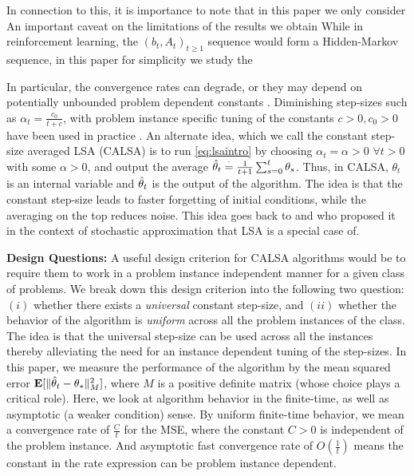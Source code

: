 \cite{tsivan95}
\cite{tsivan97}

In connection to this, it is importance to note that in this paper
we only consider An important caveat on the limitations of the results we obtain 
While in reinforcement learning, the $(b_t,A_t)_{t\ge 1}$ sequence would form a Hidden-Markov sequence, in this paper for simplicity we study the 


In particular, the convergence rates can degrade, or they may depend on potentially unbounded problem dependent constants \cite{bach-moulines}. Diminishing step-sizes such as $\alpha_t=\frac{c_0}{t+c}$, with problem instance specific tuning of the constants $c>0,c_0>0$ have been used in practice \cite{gtd2,gtdmp,konda-tsitsiklis}. 
An alternate idea, which we call the constant step-size averaged LSA (CALSA) is to run \eqref{eq:lsaintro} by choosing $\alpha_t=\alpha>0$ $\forall t> 0$ with some $\alpha>0$, and output the average $\hat{\theta}_t\stackrel{\cdot}{=}\frac{1}{t+1}\sum_{s=0}^t \theta_s$. Thus, in CALSA, $\theta_t$ is an internal variable and $\hat{\theta}_t$ is the output of the algorithm. The idea is that the constant step-size leads to faster forgetting of initial conditions, while the averaging on the top reduces noise. This idea goes back to  \citet{ruppert} and \citet{polyak-judisky} who proposed it in the context of stochastic approximation that LSA is a special case of.   
\fi

\textbf{Design Questions:} A useful design criterion for CALSA algorithms would be to require them to work in a problem instance independent manner for a given class of  problems. We break down this design criterion into the following two question: $(i)$ whether there exists a \emph{universal} constant step-size, and $(ii)$ whether the behavior of the algorithm is \emph{uniform} across all the problem instances of the class. The idea is that the universal step-size can be used across all the instances thereby alleviating the need for an instance dependent tuning of the step-sizes. In this paper, we measure the performance of the algorithm by the mean squared error $\mathbf{E}[\| \hat{\theta}_t-\theta_*\|^2_M]$, where $M$ is a positive definite matrix (whose choice plays a critical role). Here, we look at algorithm behavior in the finite-time, as well as asymptotic (a weaker condition) sense. By uniform finite-time behavior, we mean a convergence rate of $\frac{C}{t}$ for the MSE, where the constant $C>0$ is independent of the problem instance. And asymptotic fast convergence rate of $O(\frac{1}{t})$ means the constant in the rate expression can be problem instance dependent.

